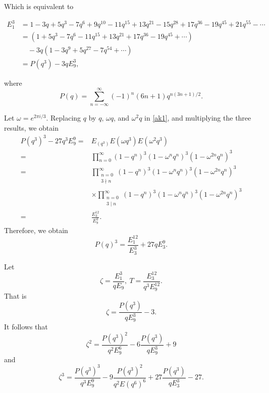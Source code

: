 \documentclass[11pt,a4paper]{article}
\numberwithin{equation}{section}
\theoremstyle{plain}
\begin{document}
\noindent	Which is equivalent to

\begin{align}\label{ak1}
	E_1^3 &= 1 - 3q + 5q^3 - 7q^6 + 9q^{10} - 11q^{15} + 13q^{21} - 15q^{28} + 17q^{36} - 19q^{45} + 21q^{55} -\nonumber \cdots \\ \nonumber
	&= (1 + 5q^3 - 7q^6 - 11q^{15} + 13q^{21} + 17q^{36} - 19q^{45} + \cdots) \\ \nonumber
	&\quad - 3q(1 - 3q^9 + 5q^{27} - 7q^{54} + \cdots) \\ 
	&= P(q^3) - 3q E_9^3,
\end{align}


\noindent	where
\begin{equation*}
	P(q) = \sum_{n=-\infty}^{\infty} (-1)^n (6n+1) q^{n(3n+1)/2}.
\end{equation*}

\noindent	Let $\omega = e^{2\pi i/3}$. Replacing $q$ by $q, \, \omega q$, and $\omega^2 q$ in \eqref{ak1}, and multiplying the three results, we obtain
\begin{align*}
	P(q^3)^3 - 27q^3 E_9^9
	=& E_(q^3) E(\omega q^3) E(\omega^2 q^3)\\
	=&\prod_{n=0}^{\infty}(1 - q^n)^3 (1 - \omega^n q^n)^3 (1 - \omega^{2n} q^n)^3\\
=& \prod_{\substack{n=0 \\ 3 \nmid n}} ^{\infty}(1 - q^n)^3 (1 - \omega^n q^n)^3 (1 - \omega^{2n} q^n)^3\\
	&\times \prod_{\substack{n=0\\ 3 \mid n}}^{\infty} (1 - q^n)^3 (1 - \omega^n q^n)^3 (1 - \omega^{2n} q^n)^3 \\
	=&\frac{E_3^{12}}{E_9^3}.
\end{align*}
Therefore, we obtain
\begin{equation*}\label{l21}
	P(q)^3=\frac{E_1^{12}}{E_3^3}+27qE_3^9.
\end{equation*}

\noindent	Let 
\begin{equation}\label{w1}
	\zeta=\frac{E_1^3}{qE_9}, \ T=\frac{E_3^{12}}{q^3E_9^{12}}.
\end{equation}
That is 
\begin{equation}\label{w2}
	\zeta=\frac{P(q^3)}{qE_9^3}-3.
\end{equation}
It follows that
\begin{equation}\label{w3}
	\zeta^2=\frac{P(q^3)^2}{q^2E_9^6}-6\frac{P(q^3)}{qE_9^3}+9
\end{equation}
and
\begin{equation}\label{w4}
	\zeta^3 = \frac{P(q^3)^3}{q^3 E_9^9} - 9 \frac{P(q^3)^2}{q^2 E(q^6)^6}
	+ 27 \frac{P(q^3)}{q E_3^3} - 27. 
\end{equation}
\end{document}
